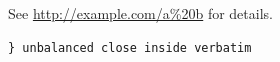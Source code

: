 \documentclass{article}
\begin{document}
See \url{http://example.com/a%20b} for details.
\begin{verbatim}
} unbalanced close inside verbatim
\end{verbatim}
\end{document}
